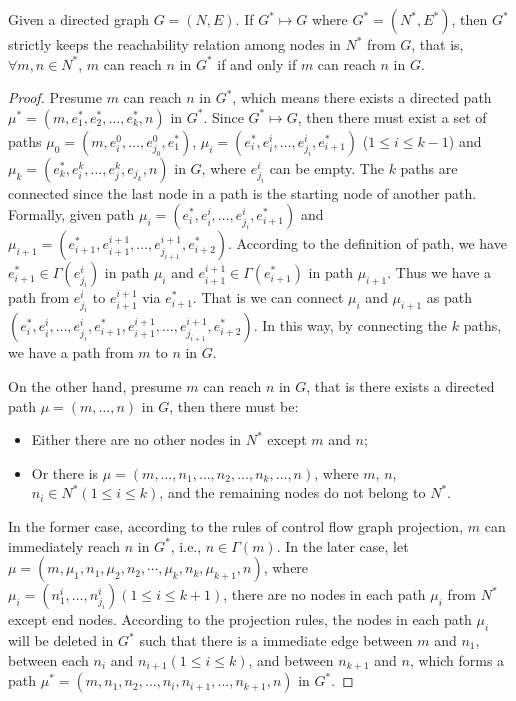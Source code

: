 \begin{theorem}
Given a directed graph $G = (N, E)$. If $G^* \mapsto G$ where $G^*=(N^*, E^*)$, then $G^*$ strictly keeps the reachability relation among nodes in $N^*$ from $G$, that is, $\forall m,n\in N^*$, $m$ can reach $n$ in $G^*$ if and only if $m$ can reach $n$ in $G$.
\end{theorem}
\begin{proof} Presume $m$ can reach $n$ in $G^*$, which means there exists a directed path $\mu^*=(m,e_1^*,e_2^*,\ldots,e_k^*,n)$ in $G^*$. 
Since $G^* \mapsto G$, then there must exist a set of paths $\mu_0=(m,e^0_i,\ldots,e^0_{j_0}, e_1^*)$, $\mu_i=(e^*_{i}, e^{i}_i,\ldots,e^{i}_{j_i}, e_{i+1}^*)$ ($1\leq i\leq k-1$) and $\mu_k=(e_k^*,e^k_i,\ldots,e^k_j, e_{j_k}, n)$ in $G$, where $e^{i}_{j_i}$ can be empty. The $k$ paths are connected since the last node in a path is the starting node of another path. Formally, given path $\mu_i=(e^*_{i}, e^{i}_i,\ldots,e^{i}_{j_i}, e_{i+1}^*)$ and $\mu_{i+1}=(e^*_{i+1}, e^{i+1}_{i+1},\ldots,e^{i+1}_{j_{i+1}}, e_{i+2}^*)$. According to the definition of path, we have $e_{i+1}^*\in \Gamma(e^{i}_{j_i})$ in path $\mu_i$
and $e^{i+1}_{i+1} \in \Gamma(e^*_{i+1})$ in path $\mu_{i+1}$. Thus we have a path from $e^{i}_{j_i}$ to $e^{i+1}_{i+1}$ via $e^*_{i+1}$. That is we can connect $\mu_i$ and $\mu_{i+1}$ as path $(e^*_{i},e^{i}_i,\ldots,e^{i}_{j_i}, e_{i+1}^*, e^{i+1}_{i+1},\ldots,e^{i+1}_{j_{i+1}}, e_{i+2}^*)$. In this way, by connecting the $k$ paths, we have a path from $m$ to $n$ in $G$.

On the other hand, presume $m$ can reach $n$ in $G$, that is there exists a directed path $\mu=(m,\ldots,n)$ in $G$, then there must be:
\begin{itemize}
\item
Either there are no other nodes in $N^*$ except $m$ and $n$; 
\item
Or there is $\mu=(m,\ldots,n_1,\ldots,n_2,\ldots,n_k,\ldots,n)$, where $m$, $n$, $n_i\in N^* (1\leq i \leq k)$, and the remaining nodes do not belong to $N^*$.
\end{itemize}
%

In the former case, according to the rules of control flow graph projection, $m$ can immediately reach $n$ in $G^*$, i.e., $n\in \Gamma(m)$.
%
In the later case, let $\mu=(m,\mu_1,n_1,\mu_2, n_2,\cdots,\mu_k, n_k, \mu_{k+1}, n)$, where $\mu_i=(n^i_{1},\ldots,n^i_{j_i}) (1\leq i\leq k+1)$, there are no nodes in each path $\mu_i$ from $N^*$ except end nodes. According to the projection rules, the nodes in each path $\mu_i$ will be deleted in $G^*$ such that there is a immediate edge between $m$ and $n_1$, between each $n_i$ and $n_{i+1} (1\leq i \leq k)$, and between $n_{k+1}$ and $n$, which forms a path $
\mu^*=(m, n_1, n_2, \ldots, n_{i}, n_{i+1}, \ldots, n_{k+1}, n)$ in $G^*$. 
\end{proof}


